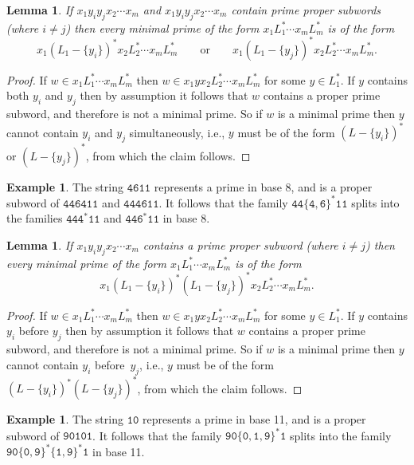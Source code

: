 \documentclass[12pt]{article}
\theoremstyle{plain}
\newtheorem{lemma}[theorem]{Lemma}
\theoremstyle{definition}
\newtheorem{example}[theorem]{Example}
\theoremstyle{remark}
\newcommand{\0}{\mathtt{0}}
\newcommand{\1}{\mathtt{1}}
\newcommand{\2}{\mathtt{2}}
\newcommand{\3}{\mathtt{3}}
\newcommand{\4}{\mathtt{4}}
\newcommand{\5}{\mathtt{5}}
\newcommand{\6}{\mathtt{6}}
\newcommand{\7}{\mathtt{7}}
\newcommand{\8}{\mathtt{8}}
\newcommand{\9}{\mathtt{9}}
\begin{document}
\begin{lemma}\label{lemsplit2}
If $x_1y_iy_jx_2\dotsm x_m$ and $x_1y_iy_jx_2\dotsm x_m$ contain prime proper subwords (where $i\neq j$) then 
every minimal prime of the form $x_1L_1^*\dotsm x_mL_m^*$ is of the form
\[x_1(L_1-\{y_i\})^*x_2L_2^*\dotsm x_mL_m^* \qquad\text{or}\qquad x_1(L_1-\{y_j\})^*x_2L_2^*\dotsm x_mL_m^* . \]
\end{lemma}
\begin{proof}
If $w\in x_1L_1^*\dotsm x_mL_m^*$ then $w\in x_1yx_2L_2^*\dotsm x_mL_m^*$ for some $y\in L_1^*$.
If $y$ contains both $y_i$ and $y_j$ then by assumption it follows that $w$ contains a proper prime subword,
and therefore is not a minimal prime.  So if $w$ is a minimal prime then $y$ cannot contain $y_i$ and $y_j$
simultaneously, i.e., $y$ must be of the form $(L-\{y_i\})^*$ or $(L-\{y_j\})^*$, from which the claim follows.
\end{proof}
\begin{example}
The string $\4\6\1\1$ represents a prime in base 8, and is a proper subword of $\4\4\6\4\1\1$ and $\4\4\4\6\1\1$.
It follows that the family $\4\4\{\4,\6\}^*\1\1$ splits into the families
$\4\4\4^*\1\1$ and $\4\4\6^*\1\1$ in base 8.
\end{example}

\begin{lemma}\label{lemsplit2b}
If $x_1y_iy_jx_2\dotsm x_m$ contains a prime proper subword (where $i\neq j$) then every minimal prime of the form
$x_1L_1^*\dotsm x_mL_m^*$ is of the form \[x_1(L_1-\{y_i\})^*(L_1-\{y_j\})^*x_2L_2^*\dotsm x_mL_m^* . \]
\end{lemma}
\begin{proof}
If $w\in x_1L_1^*\dotsm x_mL_m^*$ then $w\in x_1yx_2L_2^*\dotsm x_mL_m^*$ for some $y\in L_1^*$.
If $y$ contains $y_i$ before $y_j$ then by assumption it follows that $w$ contains a proper prime subword,
and therefore is not a minimal prime.  So if $w$ is a minimal prime then $y$ cannot contain $y_i$ before~$y_j$,
i.e., $y$ must be of the form $(L-\{y_i\})^*(L-\{y_j\})^*$, from which the claim follows.
\end{proof}
\begin{example}
The string $\1\0$ represents a prime in base 11, and is a proper subword of $\9\0\1\0\1$.
It follows that the family $\9\0\{\0,\1,\9\}^*\1$ splits into the family $\9\0\{\0,\9\}^*\{\1,\9\}^*\1$ in base 11.
\end{example}
\end{document}
